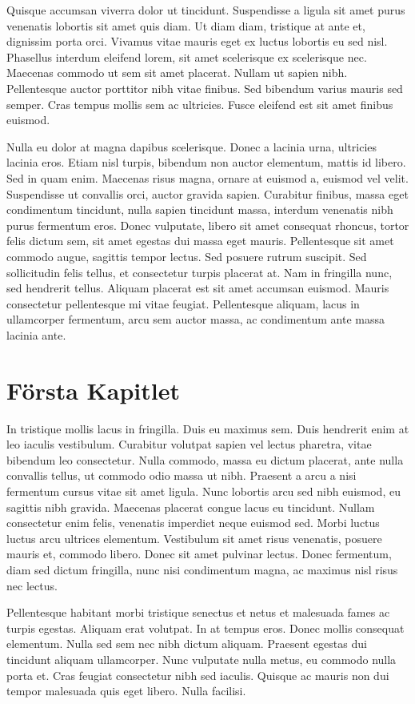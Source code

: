 \documentclass[a4paper,10pt]{article}
\begin{document}
Quisque accumsan viverra dolor ut tincidunt. Suspendisse a ligula sit amet purus venenatis lobortis sit amet quis diam. Ut diam diam, tristique at ante et, dignissim porta orci. Vivamus vitae mauris eget ex luctus lobortis eu sed nisl. Phasellus interdum eleifend lorem, sit amet scelerisque ex scelerisque nec. Maecenas commodo ut sem sit amet placerat. Nullam ut sapien nibh. Pellentesque auctor porttitor nibh vitae finibus. Sed bibendum varius mauris sed semper. Cras tempus mollis sem ac ultricies. Fusce eleifend est sit amet finibus euismod.

Nulla eu dolor at magna dapibus scelerisque. Donec a lacinia urna, ultricies lacinia eros. Etiam nisl turpis, bibendum non auctor elementum, mattis id libero. Sed in quam enim. Maecenas risus magna, ornare at euismod a, euismod vel velit. Suspendisse ut convallis orci, auctor gravida sapien. Curabitur finibus, massa eget condimentum tincidunt, nulla sapien tincidunt massa, interdum venenatis nibh purus fermentum eros. Donec vulputate, libero sit amet consequat rhoncus, tortor felis dictum sem, sit amet egestas dui massa eget mauris. Pellentesque sit amet commodo augue, sagittis tempor lectus. Sed posuere rutrum suscipit. Sed sollicitudin felis tellus, et consectetur turpis placerat at. Nam in fringilla nunc, sed hendrerit tellus. Aliquam placerat est sit amet accumsan euismod. Mauris consectetur pellentesque mi vitae feugiat. Pellentesque aliquam, lacus in ullamcorper fermentum, arcu sem auctor massa, ac condimentum ante massa lacinia ante.

\section{Första Kapitlet}
In tristique mollis lacus in fringilla. Duis eu maximus sem. Duis hendrerit enim at leo iaculis vestibulum. Curabitur volutpat sapien vel lectus pharetra, vitae bibendum leo consectetur. Nulla commodo, massa eu dictum placerat, ante nulla convallis tellus, ut commodo odio massa ut nibh. Praesent a arcu a nisi fermentum cursus vitae sit amet ligula. Nunc lobortis arcu sed nibh euismod, eu sagittis nibh gravida. Maecenas placerat congue lacus eu tincidunt. Nullam consectetur enim felis, venenatis imperdiet neque euismod sed. Morbi luctus luctus arcu ultrices elementum. Vestibulum sit amet risus venenatis, posuere mauris et, commodo libero. Donec sit amet pulvinar lectus. Donec fermentum, diam sed dictum fringilla, nunc nisi condimentum magna, ac maximus nisl risus nec lectus.

Pellentesque habitant morbi tristique senectus et netus et malesuada fames ac turpis egestas. Aliquam erat volutpat. In at tempus eros. Donec mollis consequat elementum. Nulla sed sem nec nibh dictum aliquam. Praesent egestas dui tincidunt aliquam ullamcorper. Nunc vulputate nulla metus, eu commodo nulla porta et. Cras feugiat consectetur nibh sed iaculis. Quisque ac mauris non dui tempor malesuada quis eget libero. Nulla facilisi.
\end{document}
